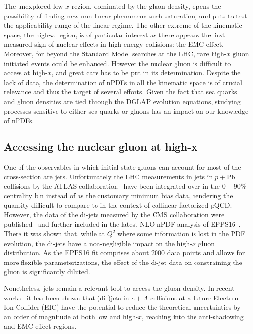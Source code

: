 The unexplored low-$x$ region, dominated by the gluon density, opens the possibility of finding new non-linear phenomena such saturation, and puts to test the applicability range of the linear regime. The other extreme of the kinematic space, the high-$x$ region, is of particular interest as there appears the first measured sign of nuclear effects in high energy collisions: the EMC effect. Moreover, for beyond the Standard Model searches at the LHC, rare high-$x$ gluon initiated events could be enhanced. However the nuclear gluon is difficult to access at high-$x$, and great care has to be put in its determination. Despite the lack of data, the determination of nPDFs in all the kinematic space is of crucial relevance and thus the target of several efforts. Given the fact that sea quarks and gluon densities are tied through the DGLAP evolution equations, studying processes sensitive to either sea quarks or gluons has an impact on our knowledge of nPDFs.    



\subsection{Accessing the nuclear gluon at high-x}

One of the observables in which initial state gluons can account for most of the cross-section are jets. Unfortunately the LHC measurements in jets in $p+\mathrm{Pb}$ collisions by the ATLAS collaboration~\cite{FIXME} have been integrated over in the $0-90\%$ centrality bin instead of as the customary minimum bias data, rendering the quantity difficult to compare to in the context of collinear factorized pQCD. However, the data of the di-jets measured by the CMS collaboration were published~\cite{FIXME} and further included in the latest NLO nPDF analysis of EPPS16~\cite{Eskola:2016oht}. There it was shown that, while at $Q^{2}$ where some information is lost in the PDF evolution, the di-jets have a non-negligible impact on the high-$x$ gluon distribution. As the EPPS16 fit comprises about $2000$ data points and allows for more flexible parameterizations, the effect of the di-jet data on constraining the gluon is significantly diluted. 

Nonetheless, jets remain a relevant tool to access the gluon density. In recent works~\cite{PhysRevD.95.094013, PhysRevD.97.114013} it has been shown that (di-)jets in $e+A$ collisions at a future Electron-Ion Collider (EIC) have the potential to reduce the theoretical uncertainties by an order of magnitude at both low and high-$x$, reaching into the anti-shadowing and EMC effect regions.

